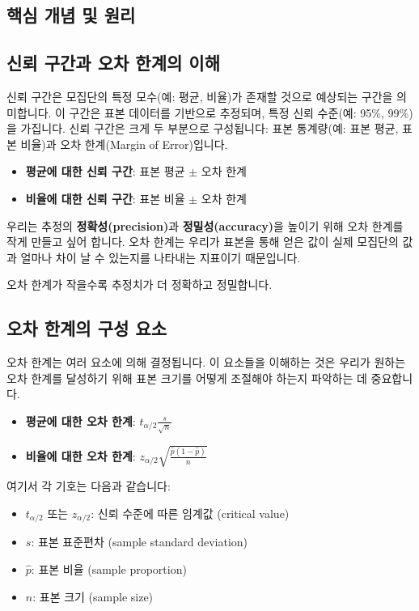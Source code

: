 \documentclass[11pt,a4paper]{book}
\theoremstyle{definition}
\begin{document}
\begin{enumerate}
\begin{enumerate}
\section{핵심 개념 및 원리}

\subsection{신뢰 구간과 오차 한계의 이해}
신뢰 구간은 모집단의 특정 모수(예: 평균, 비율)가 존재할 것으로 예상되는 구간을 의미합니다. 이 구간은 표본 데이터를 기반으로 추정되며, 특정 신뢰 수준(예: 95\%, 99\%)을 가집니다. 신뢰 구간은 크게 두 부분으로 구성됩니다: 표본 통계량(예: 표본 평균, 표본 비율)과 오차 한계(Margin of Error)입니다.

\begin{itemize}
    \item \textbf{평균에 대한 신뢰 구간}: 표본 평균 \(\pm\) 오차 한계
    \item \textbf{비율에 대한 신뢰 구간}: 표본 비율 \(\pm\) 오차 한계
\end{itemize}

우리는 추정의 \textbf{정확성(precision)}과 \textbf{정밀성(accuracy)}을 높이기 위해 오차 한계를 작게 만들고 싶어 합니다. 오차 한계는 우리가 표본을 통해 얻은 값이 실제 모집단의 값과 얼마나 차이 날 수 있는지를 나타내는 지표이기 때문입니다.

\begin{summarybox}
    오차 한계가 작을수록 추정치가 더 정확하고 정밀합니다.
\end{summarybox}

\subsection{오차 한계의 구성 요소}
오차 한계는 여러 요소에 의해 결정됩니다. 이 요소들을 이해하는 것은 우리가 원하는 오차 한계를 달성하기 위해 표본 크기를 어떻게 조절해야 하는지 파악하는 데 중요합니다.

\begin{itemize}
    \item \textbf{평균에 대한 오차 한계}: \(t_{\alpha/2} \frac{s}{\sqrt{n}}\)
    \item \textbf{비율에 대한 오차 한계}: \(z_{\alpha/2} \sqrt{\frac{\hat{p}(1-\hat{p})}{n}}\)
\end{itemize}
여기서 각 기호는 다음과 같습니다:
\begin{itemize}
    \item \(t_{\alpha/2}\) 또는 \(z_{\alpha/2}\): 신뢰 수준에 따른 임계값 (critical value)
    \item \(s\): 표본 표준편차 (sample standard deviation)
    \item \(\hat{p}\): 표본 비율 (sample proportion)
    \item \(n\): 표본 크기 (sample size)
\end{itemize}


\end{enumerate}
\end{enumerate}
\end{document}
